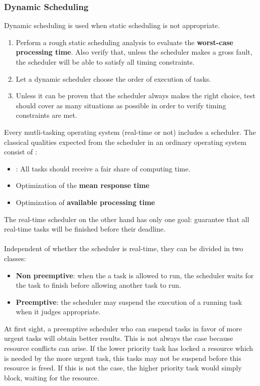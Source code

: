 \documentclass[../main.tex]{subfiles}
\begin{document}
\subsubsection{Dynamic Scheduling}
Dynamic scheduling is used when static scheduling is not appropriate.
\begin{enumerate}
	\item Perform a rough static scheduling analysis to evaluate the \textbf{worst-case processing time}. Also verify that, unless the scheduler makes a gross fault, the scheduler will be able to satisfy all timing constraints.
	\item Let a dynamic scheduler choose the order of execution of tasks.
	\item Unless it can be proven that the scheduler always makes the right choice, test should cover as many situations as possible in order to verify timing constraints are met.
\end{enumerate}

Every mutli-tasking operating system (real-time or not) includes a scheduler. The classical qualities expected from the scheduler in an ordinary operating system consist of :
\begin{itemize}
	\item {}: All tasks should receive a fair share of computing time.
	\item Optimization of the \textbf{mean response time}
	\item Optimization of \textbf{available processing time}
\end{itemize}
The real-time scheduler on the other hand has only one goal: guarantee that all real-time tasks will be finished before their deadline.
\\\\
Independent of whether the scheduler is real-time, they can be divided in two classes:
\begin{itemize}
	\item \textbf{Non preemptive}: when the a task is allowed to run, the scheduler waits for the task to finish before allowing another task to run.
	\item \textbf{Preemptive}: the scheduler may suspend the execution of a running task when it judges appropriate.
\end{itemize}

\begin{blockquote}
At first sight, a preemptive scheduler who can suspend tasks in favor of more urgent tasks will obtain better results. This is not always the case because resource conflicts can arise. If  the lower priority task has locked a resource which is needed by the more urgent task, this tasks may not be suspend before this resource is freed. If this is not the case, the higher priority task would simply block, waiting for the resource.
\end{blockquote}
\end{document}
